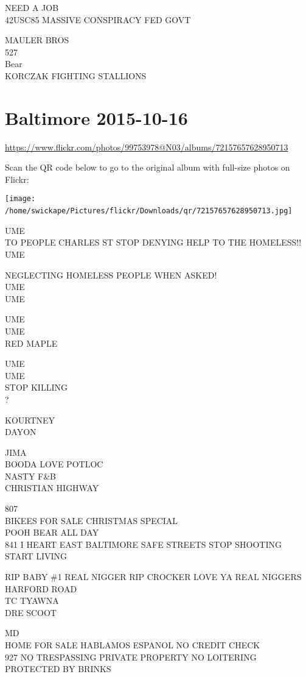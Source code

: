 \documentclass[10pt,letterpaper]{article}
\begin{document}
NEED A JOB\\
42USC85 MASSIVE CONSPIRACY FED GOVT

MAULER BROS\\
527\\
Bear\\
KORCZAK FIGHTING STALLIONS
\

\section*{Baltimore 2015-10-16}

\url{https://www.flickr.com/photos/99753978@N03/albums/72157657628950713}

Scan the QR code below to go to the original album with full-size photos on Flickr:

\texttt{[image: /home/swickape/Pictures/flickr/Downloads/qr/72157657628950713.jpg]}
\

UME\\
TO PEOPLE CHARLES ST STOP DENYING HELP TO THE HOMELESS!!\\
UME

NEGLECTING HOMELESS PEOPLE WHEN ASKED!\\
UME\\
UME

UME\\
UME\\
RED MAPLE

UME\\
UME\\
STOP KILLING\\
?

KOURTNEY\\
DAYON

JIMA\\
BOODA LOVE POTLOC\\
NASTY F\&B\\
CHRISTIAN HIGHWAY

807\\
BIKEES FOR SALE CHRISTMAS SPECIAL\\
POOH BEAR ALL DAY\\
841 I HEART EAST BALTIMORE SAFE STREETS STOP SHOOTING START LIVING

RIP BABY \#1  REAL NIGGER RIP CROCKER LOVE YA REAL NIGGERS\\
HARFORD ROAD\\
TC TYAWNA\\
DRE SCOOT

MD\\
HOME FOR SALE HABLAMOS ESPANOL NO CREDIT CHECK\\
927 NO TRESPASSING PRIVATE PROPERTY NO LOITERING\\
PROTECTED BY BRINKS
\end{document}
